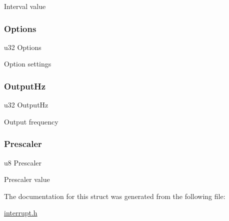 Interval value \mbox{\label{struct_tmr_cntr_setup__st_ae2514b28dbf5f74aa6f8a4b8621dda8b}} 
\subsubsection{\texorpdfstring{Options}{Options}}
{\footnotesize\ttfamily u32 Options}

Option settings \mbox{\label{struct_tmr_cntr_setup__st_a09e90f1e06a66bdf74ef386385c0d0de}} 
\subsubsection{\texorpdfstring{OutputHz}{OutputHz}}
{\footnotesize\ttfamily u32 Output\+Hz}

Output frequency \mbox{\label{struct_tmr_cntr_setup__st_a7a429dcd1272baccc893723d7e236ca9}} 
\subsubsection{\texorpdfstring{Prescaler}{Prescaler}}
{\footnotesize\ttfamily u8 Prescaler}

Prescaler value 

The documentation for this struct was generated from the following file\+:\begin{DoxyCompactItemize}
\item 
\mbox{\hyperlink{interrupt_8h}{interrupt.\+h}}\end{DoxyCompactItemize}
